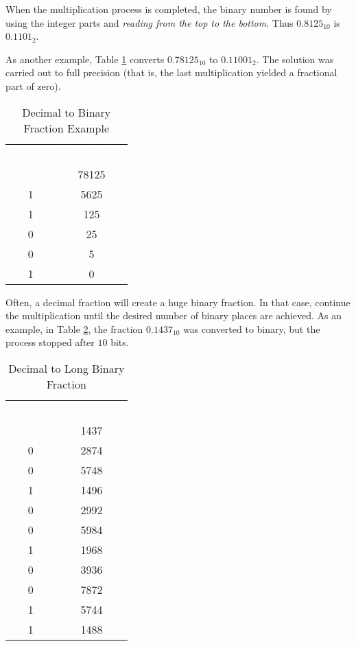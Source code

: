 When the multiplication process is completed, the binary number is found by using the integer parts and \emph{reading from the top to the bottom}. Thus $ 0.8125_{10} $ is $ 0.1101_2 $.

As another example, Table \ref{MF:tab:dec_to_bin_fraction_example_2} converts $ 0.78125_{10} $ to $ 0.11001_2 $. The solution was carried out to full precision (that is, the last multiplication yielded a fractional part of zero).

\begin{table}[H]
  \sffamily
  \newcommand{\head}[1]{\textcolor{white}{\textbf{#1}}}    
  \begin{center}
    \begin{tabular}[htb]{ c c } 
      \hline
      \rowcolor{black!75}
      \head{Integer} & \head{Remainder} \\
        & 78125 \\
      1 & 5625 \\
      1 & 125 \\
      0 & 25 \\
      0 & 5 \\
      1 & 0 \\ \hline
    \end{tabular}
  \end{center}
  \caption{Decimal to Binary Fraction Example}
  \label{MF:tab:dec_to_bin_fraction_example_2}
\end{table}

Often, a decimal fraction will create a huge binary fraction. In that case, continue the multiplication until the desired number of binary places are achieved. As an example, in Table \ref{MF:tab:dec_to_bin_long_fraction}, the fraction $ 0.1437_{10} $ was converted to binary, but the process stopped after $ 10 $ bits.

\begin{table}[H]
  \sffamily
  \newcommand{\head}[1]{\textcolor{white}{\textbf{#1}}}    
  \begin{center}
    \begin{tabular}{ c c } 
      \hline
      \rowcolor{black!75}
      \head{Integer} & \head{Remainder} \\
      & 1437 \\
      0 & 2874 \\
      0 & 5748 \\
      1 & 1496 \\
      0 & 2992 \\
      0 & 5984 \\
      1 & 1968 \\
      0 & 3936 \\
      0 & 7872 \\
      1 & 5744 \\
      1 & 1488 \\ \hline
    \end{tabular}
  \end{center}
  \caption{Decimal to Long Binary Fraction}
  \label{MF:tab:dec_to_bin_long_fraction}
\end{table}

